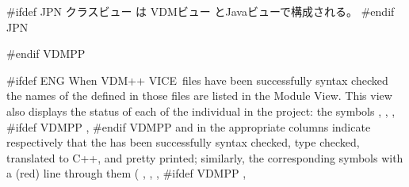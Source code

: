\documentclass[\pformat,12pt]{article}
\newcommand{\vdmslpp}{VDM-SL}
\newcommand{\vdmModView}{\guicmd{Module View}}
\newcommand{\vdmModView}{\guicmd{モジュールビュー}}
\newcommand{\vdmslpp}{VDM++}
\renewcommand{\vdmslpp}{VDM++ VICE}
\newcommand{\vdmModView}{\guicmd{VDM View}}
\newcommand{\vdmModView}{\guicmd{VDMビュー}}
\newcommand{\guicmd}[1]{{\sf #1}}
\newcommand{\guicmd}[1]{{\gt #1}}
\begin{document}
#ifdef JPN
\guicmd{クラスビュー} は \guicmd{VDMビュー} と\guicmd{Javaビュー}で構成される。
#endif JPN

#endif VDMPP

#ifdef ENG
When \vdmslpp\ files have been successfully syntax checked the names
of the  defined in those
files are listed in the \vdmModView. This view also displays the
status of each of the individual 
 in the project: the
symbols 
,
,
,
#ifdef VDMPP
,
#endif VDMPP
and
in the appropriate columns indicate respectively that the
 has been successfully
syntax checked, type checked, translated to C++,
 and pretty
printed;
similarly, the corresponding symbols with a (red) line through them (%
,
,
,
#ifdef VDMPP
,
\end{document}
